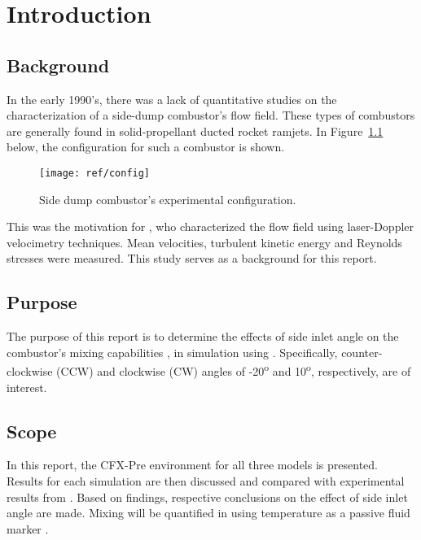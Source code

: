 \chapter{Introduction}
\label{ch:intro}

\section{Background}
\label{sect:background}

In the early 1990's, there was a lack of quantitative studies on the characterization of a side-dump combustor's flow field. These types of combustors are generally found in solid-propellant ducted rocket ramjets. In Figure~\ref{fig:config} below, the configuration for such a combustor is shown.

\begin{figure}[H]
	\centering
	\texttt{[image: ref/config]}
	\caption[Side-dump combustor's experimental configuration.]{Side dump combustor's experimental configuration. \cite{art}}
	\label{fig:config}
\end{figure}

This was the motivation for \cite{art}, who characterized the flow field using laser-Doppler velocimetry techniques. Mean velocities, turbulent kinetic energy and Reynolds stresses were measured. This study serves as a background for this report.

\section{Purpose}
\label{sect:purpose}

The purpose of this report is to determine the effects of side inlet angle on the combustor's mixing capabilities \cite{proj}, in simulation using \cite{cfx}. Specifically, counter-clockwise (CCW) and clockwise (CW) angles of -20\textsuperscript{o} and 10\textsuperscript{o}, respectively, are of interest. 


\section{Scope}
In this report, the CFX-Pre environment for all three models is presented. Results for each simulation are then discussed and compared with experimental results from \cite{art}. Based on findings, respective conclusions on the effect of side inlet angle are made. Mixing will be quantified in using temperature as a passive fluid marker \cite{proj}.
